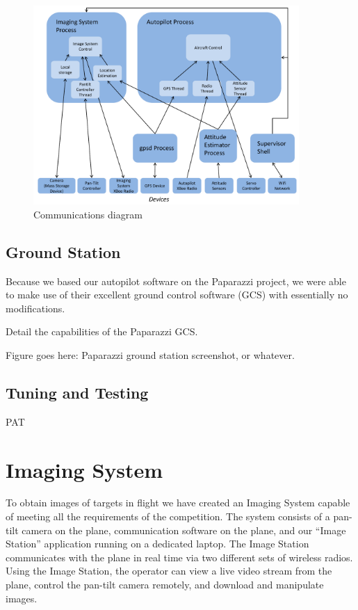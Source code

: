 \documentclass[10pt]{report}
\begin{document}
\begin{figure}
	\centering
	\includegraphics[width=0.9\textwidth]{../images/software_comm_diagram.pdf}
	\caption{Communications diagram}	
	\label{fig:software_comm_diagram}
\end{figure}

\subsection{Ground Station}
Because we based our autopilot software on the Paparazzi project, we were able to make use of their excellent ground control software (GCS) with essentially no modifications.

Detail the capabilities of the Paparazzi GCS.

Figure goes here: Paparazzi ground station screenshot, or whatever. 
\subsection{Tuning and Testing}
PAT

\section{Imaging System}

To obtain images of targets in flight we have created an Imaging System capable of meeting all the requirements of the competition.  The system consists of a pan-tilt camera on the plane, communication software on the plane, and our ``Image Station'' application running on a dedicated laptop.  The Image Station communicates with the plane in real time via two different sets of wireless radios.  Using the Image Station, the operator can view a live video stream from the plane, control the pan-tilt camera remotely, and download and manipulate images.
\end{document}
